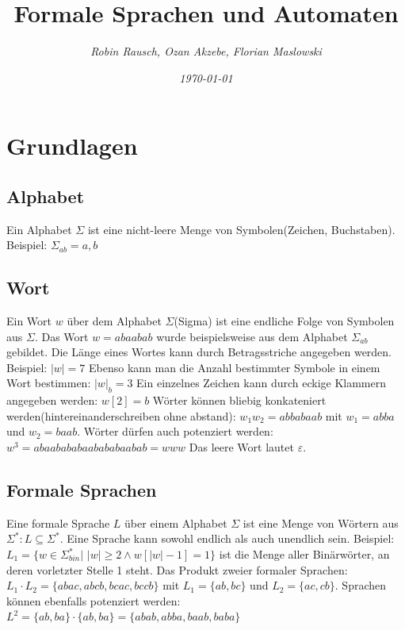 \documentclass[12pt,a4paper]{article}
\title{Formale Sprachen und Automaten}
\author{\slshape Robin Rausch, Ozan Akzebe, Florian Maslowski}
\date{\slshape \today}
\begin{document}
\maketitle
\tableofcontents
\newpage
{}
\section{Grundlagen}
	\subsection{Alphabet}
	Ein Alphabet $\varSigma$ ist eine nicht-leere Menge von Symbolen(Zeichen, Buchstaben).
	Beispiel: $\varSigma_{ab} = { a, b }$

	\subsection{Wort}
	Ein Wort $w$ über dem Alphabet $\varSigma$(Sigma) ist eine endliche Folge von Symbolen aus $\varSigma$. Das Wort $w = abaabab$ wurde beispielsweise aus dem Alphabet $\varSigma_{ab}$ gebildet.\newline
	Die Länge eines Wortes kann durch Betragsstriche angegeben werden. Beispiel: $|w| = 7$\newline
	Ebenso kann man die Anzahl bestimmter Symbole in einem Wort bestimmen: $|w|_b = 3$\newline
	Ein einzelnes Zeichen kann durch eckige Klammern angegeben werden: $w[2] = b$\newline
	Wörter können bliebig konkateniert werden(hintereinanderschreiben ohne abstand): $w_1w_2 = abbabaab$ mit $w_1 = abba$ und $w_2 = baab$.\newline
	Wörter dürfen auch potenziert werden: $w^3 = abaabababaabababaabab = www$\newline
	Das leere Wort lautet $\varepsilon$.

	\subsection{Formale Sprachen}
	Eine formale Sprache $L$ über einem Alphabet $\varSigma$ ist eine Menge von Wörtern aus $\varSigma^*: L \subseteq \varSigma^*$. Eine Sprache kann sowohl endlich als auch unendlich sein.\newline
	Beispiel: $L_1 = \{w \in \varSigma_{bin}^* |$ $|w| \geqslant 2 \wedge w[|w| - 1] = 1\}$ ist die Menge aller Binärwörter, an deren vorletzter Stelle 1 steht.\newline
	Das Produkt zweier formaler Sprachen: $L_1 \cdot L_2 = \{abac, abcb, bcac, bccb\}$ mit $L_1 = \{ab, bc\}$ und $L_2 = \{ ac, cb\}$.\newline
	Sprachen können ebenfalls potenziert werden: $L^2 = \{ab, ba\} \cdot \{ab, ba\} = \{ abab, abba, baab, baba\}$
\end{document}
